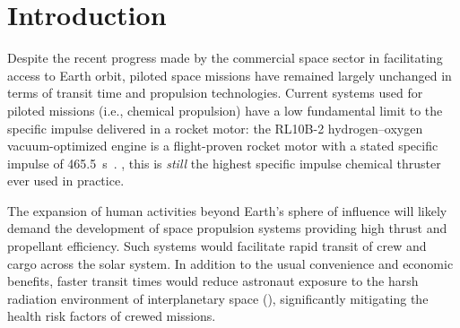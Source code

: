 \chapter{Introduction} \label{chp:intro}
    Despite the recent progress made by the commercial space sector in facilitating access to Earth orbit, piloted space missions have remained largely unchanged in terms of transit time and propulsion technologies. Current systems used for piloted missions (i.e., chemical propulsion) have a low fundamental limit to the specific impulse delivered in a rocket motor: the RL10B-2 hydrogen--oxygen vacuum-optimized engine is a flight-proven rocket motor with a stated specific impulse of \qty{465.5}{s}~\cite{l3harrisRL10Engine2023}. , this is \emph{still} the highest specific impulse chemical thruster ever used in practice.
    
    The expansion of human activities beyond Earth's sphere of influence will likely demand the development of space propulsion systems providing high thrust and propellant efficiency. Such systems would facilitate rapid transit of crew and cargo across the solar system. In addition to the usual convenience and economic benefits, faster transit times would reduce astronaut exposure to the harsh radiation environment of interplanetary space (\textcite{bergerLongTermVariations2020}), significantly mitigating the health risk factors of crewed missions.

